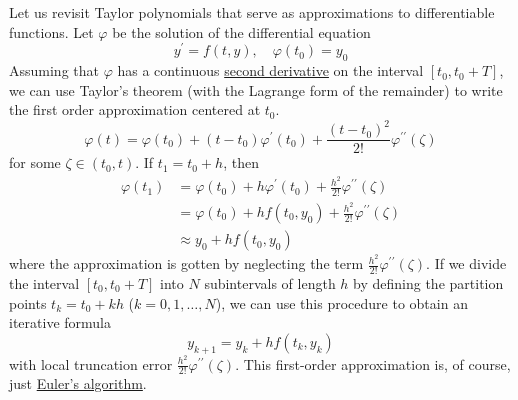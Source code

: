 \documentclass{article}
\newcounter{theorem}[section]
\begin{document}
    Let us revisit Taylor polynomials that serve as approximations to differentiable functions. Let $\varphi$ be the solution of the differential equation 
    \begin{equation}
      y^\prime = f(t, y) , \quad \varphi(t_0) = y_0
    \end{equation}
    Assuming that $\varphi$ has a continuous \hyperref[mv-def:second-derivative]{second derivative} on the interval $[t_0, t_0 + T]$, we can use Taylor's theorem (with the Lagrange form of the remainder) to write the first order approximation centered at $t_0$.  
    \begin{equation}
      \varphi(t) = \varphi(t_0) + (t - t_0) \varphi^\prime (t_0) + \frac{(t - t_0)^2}{2!} \varphi^{\prime\prime} (\zeta)
    \end{equation}
    for some $\zeta \in (t_0, t)$. If $t_1 = t_0 + h$, then
    \begin{align*}
        \varphi(t_1) & = \varphi(t_0) + h \varphi^\prime (t_0) + \frac{h^2}{2!} \varphi^{\prime\prime} (\zeta) \\
        & = \varphi(t_0) + h f(t_0, y_0) + \frac{h^2}{2!} \varphi^{\prime\prime} (\zeta) \\
        & \approx y_0 + h f(t_0, y_0)
    \end{align*}
    where the approximation is gotten by neglecting the term $\frac{h^2}{2!} \varphi^{\prime\prime} (\zeta)$. If we divide the interval $[t_0, t_0 + T]$ into $N$ subintervals of length $h$ by defining the partition points $t_k = t_0 + kh$ ($k = 0, 1, \ldots, N$), we can use this procedure to obtain an iterative formula
    \begin{equation}
      y_{k+1} = y_k + hf(t_k, y_k)
    \end{equation}
    with local truncation error $\frac{h^2}{2!} \varphi^{\prime\prime} (\zeta)$. This first-order approximation is, of course, just \hyperref[def:eulers-algorithm]{Euler's algorithm}. 
\end{document}
